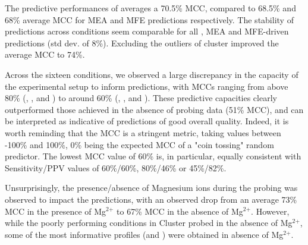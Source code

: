 \documentclass[a4,center,fleqn]{NAR}
\begin{document}
The predictive performances of \OurTool averages a 70.5\% MCC, compared to 68.5\% and 68\% average MCC for MEA and MFE predictions respectively.
The stability of predictions across conditions seem comparable for all \OurTool, MEA and MFE-driven predictions (std dev. of 8\%). Excluding the outliers of cluster  improved the average MCC to 74\%.

Across the sixteen conditions, we observed a large discrepancy in the capacity of the experimental setup to inform predictions, with MCCs ranging from above 80\% (\NMIA, \NMIAMg, \OneMSevILU and \OneMSevILUMg) to around 60\% (\NAICE, \BzCN, \OneMSevCE and \NMIACE). 
 These predictive capacities clearly outperformed those achieved in the absence of probing data (51\% MCC), and can be interpreted as indicative of predictions of good overall quality. Indeed, it is worth reminding that the MCC is a stringent metric, taking values between -100\% and 100\%, 0\% being the expected MCC of a "coin tossing" random predictor. The lowest MCC value of 60\% is, in particular, equally consistent with Sensitivity/PPV values of 60\%/60\%, 80\%/46\% or 45\%/82\%.

Unsurprisingly, the presence/absence of Magnesium ions during the probing was observed to impact the predictions, with an observed drop from an average 73\% MCC in the presence of Mg$^\text{2+}$ to 67\% MCC in the absence of Mg$^\text{2+}$. However, while the poorly performing conditions in Cluster   probed in the absence of Mg$^\text{2+}$, some of the most informative profiles (\OneMSevILU and \NMIA) were obtained in absence of Mg$^\text{2+}$.
\end{document}
